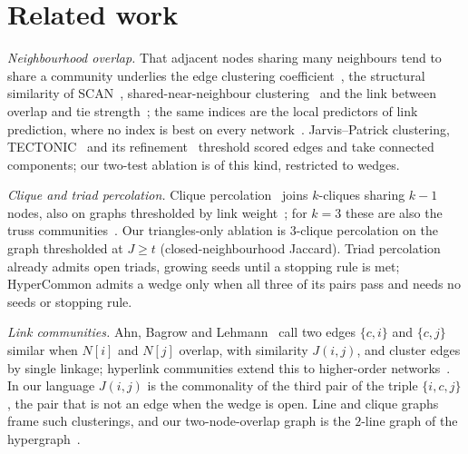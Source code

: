 \section{Related work}
\label{sec:related}

\emph{Neighbourhood overlap.} That adjacent nodes sharing many neighbours tend to share a
community underlies the edge clustering coefficient~\cite{radicchi2004defining}, the
structural similarity of SCAN~\cite{xu2007scan}, shared-near-neighbour
clustering~\cite{jarvis1973clustering} and the link between overlap and tie
strength~\cite{onnela2007structure}; the same indices are the local predictors of link
prediction, where no index is best on every network~\cite{ghasemian2020stacking}.
Jarvis--Patrick clustering, TECTONIC~\cite{tsourakakis2017scalable} and its
refinement~\cite{chen2024parallel} threshold scored edges and take connected components;
our two-test ablation is of this kind, restricted to wedges.

\emph{Clique and triad percolation.} Clique percolation~\cite{palla2005uncovering} joins
$k$-cliques sharing $k-1$ nodes, also on graphs thresholded by link
weight~\cite{kumpula2008sequential,farkas2007weighted}; for $k=3$ these are also the
truss communities~\cite{cohen2008trusses,huang2014querying,sariyuce2015finding}. Our
triangles-only ablation is 3-clique percolation on the graph thresholded at $J\ge t$
(closed-neighbourhood Jaccard). Triad percolation~\cite{zhang2018triad} already admits
open triads, growing seeds until a stopping rule is met; HyperCommon admits a wedge only
when all three of its pairs pass and needs no seeds or stopping rule.

\emph{Link communities.} Ahn, Bagrow and Lehmann~\cite{ahn2010link} call two edges
$\{c,i\}$ and $\{c,j\}$ similar when $N[i]$ and $N[j]$ overlap, with similarity $J(i,j)$,
and cluster edges by single linkage; hyperlink communities extend this to higher-order
networks~\cite{lotito2024hyperlink}. In our language $J(i,j)$ is the commonality of the
third pair of the triple $\{i,c,j\}$, the pair that is not an edge when the wedge is
open. Line and clique graphs~\cite{evans2009line,evans2010clique} frame such
clusterings, and our two-node-overlap graph is the $2$-line graph of the
hypergraph~\cite{aksoy2020hypernetwork}.

